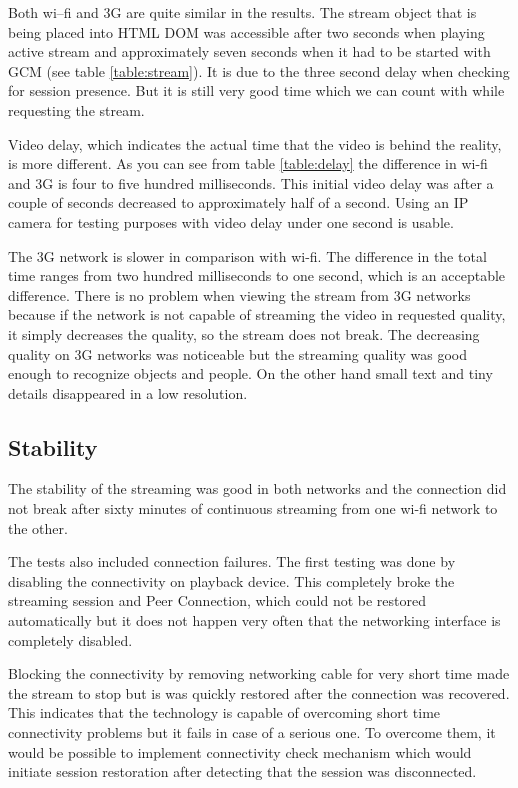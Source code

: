 Both wi--fi and 3G are quite similar in the results. The stream object that is being placed into HTML DOM was accessible after two seconds when playing active stream and approximately seven seconds when it had to be started with GCM (see table \ref{table:stream}). It is due to the three second delay when checking for session presence. But it is still very good time which we can count with while requesting the stream.

Video delay, which indicates the actual time that the video is behind the reality, is more different. As you can see from table \ref{table:delay} the difference in wi-fi and 3G is four to five hundred milliseconds. This initial video delay was after a couple of seconds decreased to approximately half of a second. Using an IP camera for testing purposes with video delay under one second is usable.

The 3G network is slower in comparison with wi-fi. The difference in the total time ranges from two hundred milliseconds to one second, which is an acceptable difference. There is no problem when viewing the stream from 3G networks because if the network is not capable of streaming the video in requested quality, it simply decreases the quality, so the stream does not break. The decreasing quality on 3G networks was noticeable but the streaming quality was good enough to recognize objects and people. On the other hand small text and tiny details disappeared in a low resolution. 


\subsection{Stability}
The stability of the streaming was good in both networks and the connection did not break after sixty minutes of continuous streaming from one wi-fi network to the other.

The tests also included connection failures. The first testing was done by disabling the connectivity on playback device. This completely broke the streaming session and Peer Connection, which could not be restored automatically but it does not happen very often that the networking interface is completely disabled.

Blocking the connectivity by removing networking cable for very short time made the stream to stop but is was quickly restored after the connection was recovered. This indicates that the technology is capable of overcoming short time connectivity problems but it fails in case of a serious one. To overcome them, it would be possible to implement connectivity check mechanism which would initiate session restoration after detecting that the session was disconnected.


